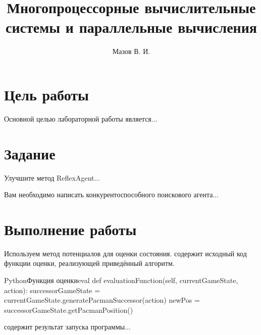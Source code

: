 \documentclass{lab_report}
\begin{document}
\title{Многопроцессорные вычислительные системы и параллельные вычисления}
\author{Мазов В. И.}

\maketitle

\tableofcontents

\section{Цель работы}
Основной целью лабораторной работы является...


\section{Задание}
\begin{task}
	Улучшите метод ReflexAgent...
\end{task}

\begin{task}
	Вам необходимо написать конкурентоспособного поискового агента...
\end{task}

\section{Выполнение работы}

\taskDoneSection
Используем метод потенциалов для оценки состояния.  содержит исходный код функции оценки, реализующей приведённый алгоритм.

\begin{listing}{Python}{Функция оценки}{eval}
def evaluationFunction(self, currentGameState, action): 
	successorGameState = currentGameState.generatePacmanSuccessor(action)
	newPos = successorGameState.getPacmanPosition()
\end{listing}

 содержит результат запуска программы...

\end{document}
